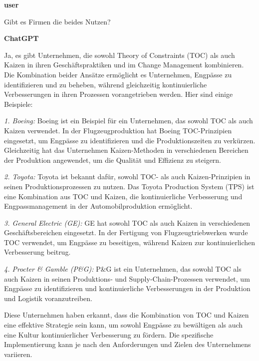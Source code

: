 \textbf{user}

Gibt es Firmen die beides Nutzen? 

\textbf{ChatGPT}

Ja, es gibt Unternehmen, die sowohl Theory of Constraints (TOC) als auch Kaizen in ihren Geschäftspraktiken und im Change Management kombinieren. Die Kombination beider Ansätze ermöglicht es Unternehmen, Engpässe zu identifizieren und zu beheben, während gleichzeitig kontinuierliche Verbesserungen in ihren Prozessen vorangetrieben werden. Hier sind einige Beispiele:

\textit{1. Boeing:} Boeing ist ein Beispiel für ein Unternehmen, das sowohl TOC als auch Kaizen verwendet. In der Flugzeugproduktion hat Boeing TOC-Prinzipien eingesetzt, um Engpässe zu identifizieren und die Produktionszeiten zu verkürzen. Gleichzeitig hat das Unternehmen Kaizen-Methoden in verschiedenen Bereichen der Produktion angewendet, um die Qualität und Effizienz zu steigern.

\textit{2. Toyota:} Toyota ist bekannt dafür, sowohl TOC- als auch Kaizen-Prinzipien in seinen Produktionsprozessen zu nutzen. Das Toyota Production System (TPS) ist eine Kombination aus TOC und Kaizen, die kontinuierliche Verbesserung und Engpassmanagement in der Automobilproduktion ermöglicht.

\textit{3. General Electric (GE):} GE hat sowohl TOC als auch Kaizen in verschiedenen Geschäftsbereichen eingesetzt. In der Fertigung von Flugzeugtriebwerken wurde TOC verwendet, um Engpässe zu beseitigen, während Kaizen zur kontinuierlichen Verbesserung beitrug.

\textit{4. Procter \& Gamble (P\&G):} P\&G ist ein Unternehmen, das sowohl TOC als auch Kaizen in seinen Produktions- und Supply-Chain-Prozessen verwendet, um Engpässe zu identifizieren und kontinuierliche Verbesserungen in der Produktion und Logistik voranzutreiben.

Diese Unternehmen haben erkannt, dass die Kombination von TOC und Kaizen eine effektive Strategie sein kann, um sowohl Engpässe zu bewältigen als auch eine Kultur kontinuierlicher Verbesserung zu fördern. Die spezifische Implementierung kann je nach den Anforderungen und Zielen des Unternehmens variieren.